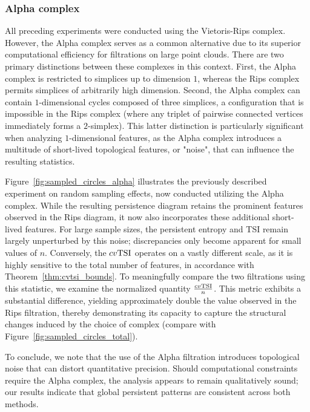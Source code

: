 \documentclass[11pt]{amsart}
\theoremstyle{definition}
\newcommand{\tsi}[0]{\textup{TSI}}
\begin{document}
\subsubsection{Alpha complex} 
All preceding experiments were conducted using the Vietoris-Rips complex. However, the Alpha complex serves as a common alternative due to its superior computational efficiency for filtrations on large point clouds. There are two primary distinctions between these complexes in this context. First, the Alpha complex is restricted to simplices up to dimension $1$, whereas the Rips complex permits simplices of arbitrarily high dimension. Second, the Alpha complex can contain $1$-dimensional cycles composed of three simplices, a configuration that is impossible in the Rips complex (where any triplet of pairwise connected vertices immediately forms a $2$-simplex). This latter distinction is particularly significant when analyzing $1$-dimensional features, as the Alpha complex introduces a multitude of short-lived topological features, or "noise", that can influence the resulting statistics.

Figure~\ref{fig:sampled_circles_alpha} illustrates the previously described experiment on random sampling effects, now conducted utilizing the Alpha complex. While the resulting persistence diagram retains the prominent features observed in the Rips diagram, it now also incorporates these additional short-lived features. For large sample sizes, the persistent entropy and TSI remain largely unperturbed by this noise; discrepancies only become apparent for small values of $n$. Conversely, the $cv\tsi$ operates on a vastly different scale, as it is highly sensitive to the total number of features, in accordance with Theorem~\ref{thm:cvtsi_bounds}. To meaningfully compare the two filtrations using this statistic, we examine the normalized quantity $\frac{cv\tsi}{n}$. This metric exhibits a substantial difference, yielding approximately double the value observed in the Rips filtration, thereby demonstrating its capacity to capture the structural changes induced by the choice of complex (compare with Figure~\ref{fig:sampled_circles_total}).

To conclude, we note that the use of the Alpha filtration introduces topological noise that can distort quantitative precision. Should computational constraints require the Alpha complex, the analysis appears to remain qualitatively sound; our results indicate that global persistent patterns are consistent across both methods.
\end{document}
